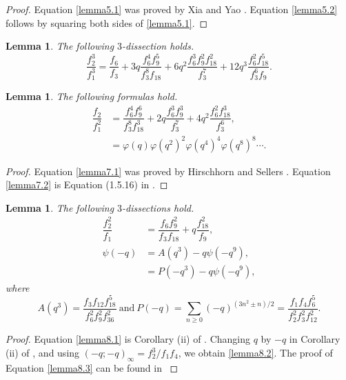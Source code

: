 \documentclass[12pt]{amsart}
\theoremstyle{plain}
\newtheorem{lemma}[theorem]{Lemma}
\theoremstyle{definition}
\begin{document}
\begin{proof}
Equation \eqref{lemma5.1} was proved by Xia and Yao \cite{XiaYao2012}. Equation \eqref{lemma5.2} follows by squaring both sides of \eqref{lemma5.1}.
\end{proof}

\begin{lemma}\cite[Eq. (3.1)]{Toh2012} \label{lemma6} The following $3$-dissection holds.
\begin{equation}
\dfrac{f_{2}^{3}}{f_{1}^{3}}=\dfrac{f_{6}}{f_{3}} + 3q\dfrac{f_{6}^{4}f_{9}^{5}}{f_{3}^{8}f_{18}} +6q^{2} \dfrac{f_{6}^{3}f_{9}^{2}f_{18}^{2}}{f_{3}^{7}} +12q^{3} \dfrac{f_{6}^{2}f_{18}^{5}}{f_{3}^{6}f_{9}}. \label{lemma6.1}
\end{equation}
\end{lemma}

\begin{lemma} \label{lemma7} The following formulas hold.
\begin{align}
\dfrac{f_{2}}{f_{1}^{2}}&=\dfrac{f_{6}^{4}f_{9}^{6}}{f_{3}^{8}f_{18}^{3}}+2q\dfrac{f_{6}^{3}f_{9}^{3}}{f_{3}^{7}}+4q^{2}\dfrac{f_{6}^{2}f_{18}^{3}}{f_{3}^{6}},\label{lemma7.1}\\
&= \varphi(q) \varphi(q^2)^2 \varphi(q^4)^4 \varphi(q^8)^8 \cdots. \label{lemma7.2}
\end{align}
\end{lemma}

\begin{proof}
Equation \eqref{lemma7.1} was proved by Hirschhorn and Sellers \cite[Eq. (3), Thm. 1]{HirschhornSellers2005b}. Equation \eqref{lemma7.2} is Equation (1.5.16) in \cite{Hirschhorn2017}.
\end{proof}



\begin{lemma} \label{lemma8}  The following $3$-dissections hold.
\begin{align}
\dfrac{f_{2}^{2}}{f_{1}}&=\dfrac{f_{6}f_{9}^{2}}{f_{3}f_{18}}+q\dfrac{f_{18}^{2}}{f_{9}}, \label{lemma8.1}\\
\psi(-q)&= A(q^{3}) - q \psi(-q^{9}), \label{lemma8.2}\\
&= P(-q^{3}) - q \psi(-q^{9}), \label{lemma8.3}
\end{align}
where 
\[
A(q^{3})= \dfrac{f_{3} f_{12} f_{18}^{5}}{f_{6}^{2} f_{9}^{2} f_{36}^{2}} \ \mathrm{and} \ P(-q)=\sum_{n \geq 0}(-q)^{(3n^2 \pm n)/2} =  \frac{f_1 f_4 f_6^5}{f_2^2 f_3^2 f_{12}^2}.
\]
\end{lemma}
\begin{proof}
Equation \eqref{lemma8.1} is Corollary (ii) of \cite[p. 49]{Berndt1991}. Changing $q$ by $-q$ in Corollary (ii) of \cite[p. 49]{Berndt1991}, and using $(-q;-q)_{\infty}=f_{2}^{3}/f_{1} f_{4}$, we obtain \eqref{lemma8.2}. The proof of Equation \eqref{lemma8.3} can be found in \cite[p. 274-275]{HirschhornSellers2010}
\end{proof}
\end{document}

